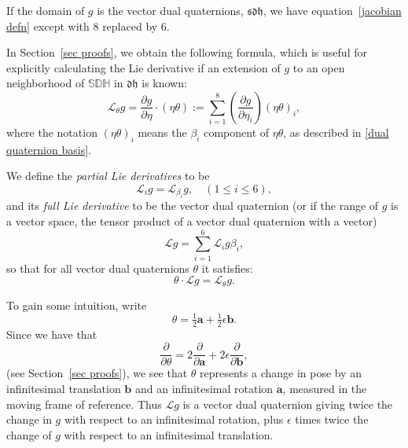 \documentclass[reqno,12pt]{amsart}
\newcommand\setdualquat{\mathfrak d \mathfrak h}
\newcommand\setunitdualquat{\mathbb S\mathbb D\mathbb H}
\newcommand\setvectordualquat{\mathfrak{s}\mathfrak d \mathfrak h}
\newcommand{\liederiv}{\mathcal L}
\begin{document}
If the domain of $g$ is the vector dual quaternions, $\setvectordualquat$, we have equation~\eqref{jacobian defn} except with $8$ replaced by $6$.

In Section~\ref{sec proofs}, we obtain the following formula, which is useful for explicitly calculating the Lie derivative if an extension of $g$ to an open neighborhood of $\setunitdualquat$ in $\setdualquat$ is known:
\begin{equation}
\label{lie diff defn 2}
\liederiv_\theta g = \frac{\partial g}{\partial \eta} \cdot (\eta \theta) := \sum_{i=1}^8 \left(\frac{\partial g}{\partial \eta_i}\right) (\eta \theta)_i ,
\end{equation}
where the notation $(\eta\theta)_i$ means the $\beta_i$ component of $\eta\theta$, as described in \eqref{dual quaternion basis}.

We define the \emph{partial Lie derivatives} to be
\begin{equation}
\liederiv_i g = \liederiv_{\beta_i} g , \quad (1 \le i \le 6),
\end{equation}
and its \emph{full Lie derivative} to be the vector dual quaternion (or if the range of $g$ is a vector space, the tensor product of a vector dual quaternion with a vector)
\begin{equation}
\liederiv g = \sum_{i=1}^6 \liederiv_i g \beta_i,
\end{equation}
so that for all vector dual quaternions $\theta$ it satisfies:
\begin{equation}
\theta \cdot \liederiv g = \liederiv_\theta g.
\end{equation}

To gain some intuition, write
\begin{equation}
\label{decomp theta}
\theta = \tfrac12\bm a + \tfrac12\epsilon \bm b.
\end{equation}
Since we have that
\begin{equation}
\label{decomp partial theta}
\frac{\partial}{\partial \theta} = 2\frac{\partial}{\partial \bm a} + 2\epsilon \frac{\partial}{\partial \bm b},
\end{equation}
(see Section~\ref{sec proofs}), we see that $\theta$ represents a change in pose by an infinitesimal translation $\bm b$ and an infinitesimal rotation $\bm a$, measured in the moving frame of reference.  Thus $\liederiv g$ is a vector dual quaternion giving twice the change in $g$ with respect to an infinitesimal rotation, plus $\epsilon$ times twice the change of $g$ with respect to an infinitesimal translation.
\end{document}
